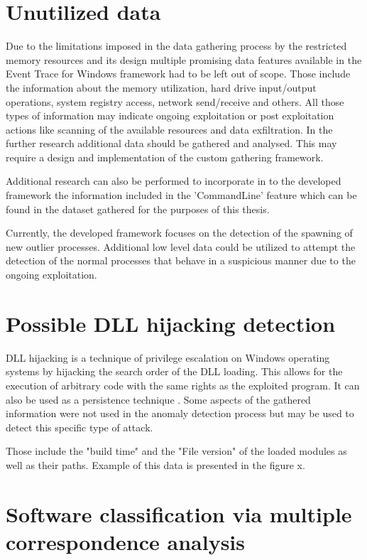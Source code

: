 \documentclass[a4paper,twoside,12pt]{book}
\begin{document}
\section{Unutilized data}

Due to the limitations imposed in the data gathering process by the restricted memory resources and its
design multiple promising data features available in the Event Trace for Windows framework had to be
left out of scope. Those include the information about the memory utilization, hard drive input/output 
operations, system registry access, network send/receive and others. All those types of information
may indicate ongoing exploitation or post exploitation actions like scanning of the available resources
and data exfiltration. In the further research additional 
data should be gathered and analysed. This may require a design and implementation of the custom  
gathering framework.

Additional research can also be performed to incorporate in to the developed framework the 
information included in the 'CommandLine' feature which can be found in the dataset gathered for the purposes
of this thesis.

Currently, the developed framework focuses on the detection of the spawning of new outlier processes.
Additional low level data could be utilized to attempt the detection of the normal processes that behave
in a suspicious manner due to the ongoing exploitation.

\section{Possible DLL hijacking detection}

DLL hijacking is a technique of privilege escalation on Windows operating systems by hijacking the 
search order of the DLL loading. This allows for the execution of arbitrary code with the same rights 
as the exploited program. It can also be used as a persistence technique \cite{bib:DLLhijacking}.
Some aspects of the gathered information were not used in the anomaly detection process but may be
used to detect this specific type of attack. 

Those include the "build time" and the "File version" of the loaded modules as well as their paths.
Example of this data is presented in the figure x.

\section{Software classification via multiple correspondence analysis}
\end{document}
